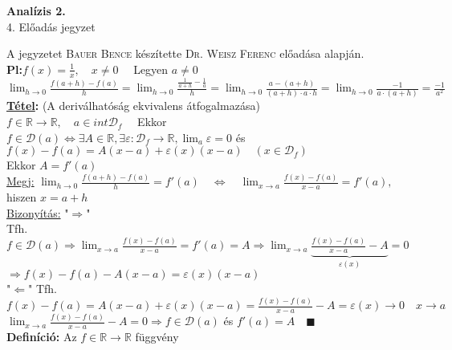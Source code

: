 \documentclass[a4paper,11pt]{article}
\begin{document}
\def\R{\mathbb{R}}
\def\N{\mathbb{N}}
\def\biz{\normalsize{\underline{Bizonyítás:} }\hspace*{0.5cm}}
\def\tetel{\normalsize \textbf{\underline{Tétel}: }}
\def\defi{\normalsize \textbf{Definíció: }}
\def\limn{\displaystyle\lim_{n\to +\infty}}
\def\limh{\displaystyle\lim_{h\to0}}
\def\limxa{\displaystyle\lim_{x\to a}}
\def\limxatelj{\displaystyle\lim_{x\to a}\frac{f(x)-f(a)}{x-a}}
\def\pl{\textbf{Pl:}}
\def\rtr{\R\to\R}
\def\D{\mathcal{D}}
\def\lima{\displaystyle\lim_{a}}
\def\bizva{\quad\blacksquare}
\def\fda{f\in\D(a)}
\begin{center}
	{\LARGE\textbf{Analízis 2.}}\\[0.2cm]
	
	{\Large 4. Előadás jegyzet}\\[1cm]	
\end{center}
{\small A jegyzetet \textsc{Bauer Bence} készítette \textsc{Dr. Weisz Ferenc} előadása alapján.}\\[0.2cm]
\pl $f(x)=\frac{1}{x},\quad x\neq 0\quad$ Legyen $a\neq 0$\\[0.1cm]$\limh\frac{f(a+h)-f(a)}{h}=\limh\frac{\frac{1}{a+h}-
\frac{1}{a}}{h}= \limh\frac{a-(a+h)}{(a+h)\cdot a\cdot h}=\limh
\frac{-1}{a\cdot(a+h)} =\frac{-1}{a^2}$ \\[0.2cm]\tetel (A deriválhatóság
ekvivalens átfogalmazása)\\[0.1cm] $f\in\rtr,\quad a\in int\D_f\quad$
Ekkor\\[0.1cm]$\fda\Leftrightarrow\exists A\in\R,\exists\varepsilon:
\D_f\to\R,\lima\varepsilon=0$ és $f(x)-f(a)=A(x-a)+\varepsilon(x)(x-a)\quad
(x\in\D_f)$\\[0.1cm]Ekkor $A=f'(a)$\\[0.1cm]\hspace*{1cm}\underline{Megj:}
$\limh\frac{f(a+h)-f(a)}{h}=f'(a)\quad\Leftrightarrow\quad\limxa
\frac{f(x)-f(a)}{x-a}=f'(a),\quad$hiszen $x=a+h$\\[0.3cm]\biz
"$\Rightarrow$"\\[0.1cm]Tfh. $f\in\D(a)\Rightarrow\limxatelj=f'(a)=A
\Rightarrow\limxa\underbrace{\frac{f(x)-f(a)}{x-a}-A}_{\varepsilon(x)}=0$
\\[0.2cm]$\Rightarrow f(x)-f(a)-A(x-a)=\varepsilon(x)(x-a)$\\[0.2cm]
"$\Leftarrow$" Tfh.\\[0.1cm]$f(x)-f(a)=A(x-a)+\varepsilon(x)(x-a)=
\frac{f(x)-f(a)}{x-a}-A=\varepsilon(x)\to0\quad x\to a$\\[0.1cm] $\limxatelj-A=0
\Rightarrow\fda$ és $f'(a)=A\bizva$\\[0.2cm]\defi Az $f\in\rtr$ függvény 
\end{document}
